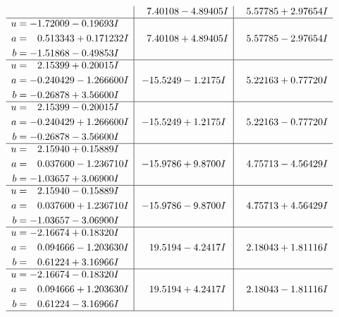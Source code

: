 \documentclass[1p]{elsarticle_modified}
\theoremstyle{definition}
\begin{document}
$$\begin{array}{c|c|c}
 & \phantom{-}7.40108 - 4.89405 I & \phantom{-}5.57785 + 2.97654 I \\ \hline\begin{aligned}
u &= -1.72009 - 0.19693 I \\
a &= \phantom{-}0.513343 + 0.171232 I \\
b &= -1.51868 - 0.49853 I\end{aligned}
 & \phantom{-}7.40108 + 4.89405 I & \phantom{-}5.57785 - 2.97654 I \\ \hline\begin{aligned}
u &= \phantom{-}2.15399 + 0.20015 I \\
a &= -0.240429 - 1.266600 I \\
b &= -0.26878 + 3.56600 I\end{aligned}
 & -15.5249 - 1.2175 I & \phantom{-}5.22163 + 0.77720 I \\ \hline\begin{aligned}
u &= \phantom{-}2.15399 - 0.20015 I \\
a &= -0.240429 + 1.266600 I \\
b &= -0.26878 - 3.56600 I\end{aligned}
 & -15.5249 + 1.2175 I & \phantom{-}5.22163 - 0.77720 I \\ \hline\begin{aligned}
u &= \phantom{-}2.15940 + 0.15889 I \\
a &= \phantom{-}0.037600 - 1.236710 I \\
b &= -1.03657 + 3.06900 I\end{aligned}
 & -15.9786 + 9.8700 I & \phantom{-}4.75713 - 4.56429 I \\ \hline\begin{aligned}
u &= \phantom{-}2.15940 - 0.15889 I \\
a &= \phantom{-}0.037600 + 1.236710 I \\
b &= -1.03657 - 3.06900 I\end{aligned}
 & -15.9786 - 9.8700 I & \phantom{-}4.75713 + 4.56429 I \\ \hline\begin{aligned}
u &= -2.16674 + 0.18320 I \\
a &= \phantom{-}0.094666 - 1.203630 I \\
b &= \phantom{-}0.61224 + 3.16966 I\end{aligned}
 & \phantom{-}19.5194 - 4.2417 I & \phantom{-}2.18043 + 1.81116 I \\ \hline\begin{aligned}
u &= -2.16674 - 0.18320 I \\
a &= \phantom{-}0.094666 + 1.203630 I \\
b &= \phantom{-}0.61224 - 3.16966 I\end{aligned}
 & \phantom{-}19.5194 + 4.2417 I & \phantom{-}2.18043 - 1.81116 I\\
 \hline 
 \end{array}$$\newpage\newpage\renewcommand{\arraystretch}{1}
\end{document}
